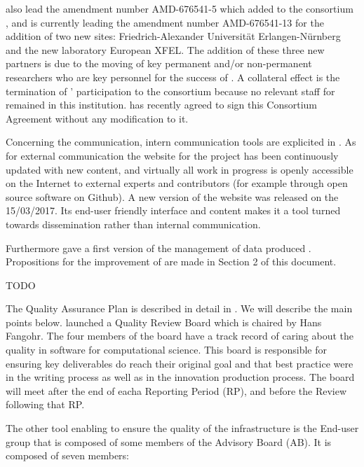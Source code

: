 \documentclass{deliverablereport}
\begin{document}
 also lead the amendment number AMD-676541-5 which added to the consortium , and is currently leading the amendment number AMD-676541-13 for the addition of two new sites: Friedrich-Alexander Universität Erlangen-Nürnberg and the new laboratory European XFEL. The addition of these three new partners is due to the moving of key permanent and/or non-permanent researchers who are key personnel for the success of \ODK. A collateral effect is the termination of ' participation to the consortium because no relevant staff for \ODK remained in this institution.
 has recently agreed to sign this Consortium Agreement
without any modification to it.


Concerning the communication, intern communication tools are explicited in .
As for external communication the website for the project has been continuously
updated with new content, and virtually all work in progress is openly
accessible on the Internet to external experts and contributors (for
example through open source software on Github). A new version of the website was released on the 15/03/2017. Its end-user friendly interface and content makes it a tool turned towards dissemination rather than internal communication.

 
Furthermore  gave a first version of the management of data produced \ODK. Propositions for the improvement of are made in Section 2 of this document. 




TODO

The Quality Assurance Plan is described in detail in . We will describe the main points below.
 launched a Quality Review Board which is chaired by Hans Fangohr. The four members of the board have a track record of caring about the quality in software for computational science. This board is responsible for ensuring key deliverables do reach their original goal and that best practice were in the writing process as well as in the innovation production process.
The board will meet after the end of eacha Reporting Period (RP), and before the Review following that RP.

The other tool enabling \ODK to ensure the quality of the infrastructure is the End-user group that is composed of some members of the Advisory Board (AB). It is composed of seven members:
\end{document}
